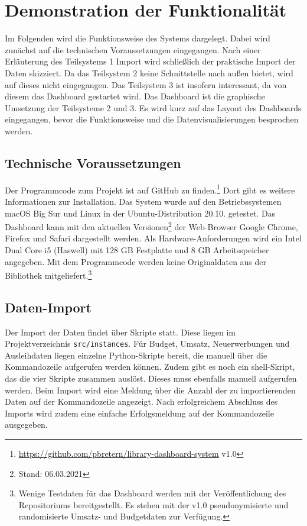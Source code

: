 
\section{Demonstration der Funktionalität}

    Im Folgenden wird die Funktionsweise des Systems dargelegt. 
    Dabei wird zunächst auf die technischen Voraussetzungen eingegangen.
    Nach einer Erläuterung des Teilsystems 1 Import wird schließlich der
    praktische Import der Daten skizziert. Da das Teilsystem 2 keine Schnittstelle
    nach außen bietet, wird auf dieses nicht eingegangen. Das Teilsystem 3 ist insofern interessant, da von diesem das Dashboard
    gestartet wird. Das Dashboard ist die graphische Umsetzung der Teilsysteme 2 und 3.
    Es wird kurz auf das Layout des Dashboards eingegangen, bevor die Funktionsweise und die Datenvisualisierungen besprochen werden.


    \subsection{Technische Voraussetzungen}
    Der Programmcode zum Projekt ist auf GitHub zu finden.\footnote{ \url{https://github.com/pbretern/library-dashboard-system} v1.0} Dort gibt es weitere Informationen zur Installation.
    Das System wurde auf den Betriebssystemen macOS Big Sur und Linux in der Ubuntu-Distribution 20.10. getestet.
    Das Dashboard kann mit den aktuellen Versionen\footnote{ Stand: 06.03.2021} der Web-Browser Google Chrome, Firefox und Safari dargestellt werden. 
    Als Hardware-Anforderungen wird ein Intel Dual Core i5 (Haswell) mit 128 GB Festplatte und 8 GB Arbeitsspeicher angegeben. 
    Mit dem Programmcode werden keine Originaldaten aus der Bibliothek mitgeliefert.\footnote{ Wenige Testdaten für das Dashboard werden mit der Veröffentlichung des Repositoriums
    bereitgestellt. Es stehen mit der v1.0 pseudonymisierte und randomisierte Umsatz- und Budgetdaten zur Verfügung.}
    
    \subsection{Daten-Import}
    Der Import der Daten findet über Skripte statt. Diese liegen im Projektverzeichnis \texttt{src/instances}.
    Für Budget, Umsatz, Neuerwerbungen und Ausleihdaten liegen einzelne Python-Skripte bereit, die manuell über die Kommandozeile
    aufgerufen werden können. Zudem gibt es noch ein shell-Skript, das die vier Skripte zusammen auslöst. Dieses
    muss ebenfalls manuell aufgerufen werden.
    Beim Import wird eine Meldung über die Anzahl der zu importierenden Daten auf der Kommandozeile angezeigt. 
    Nach erfolgreichem Abschluss des Imports wird zudem eine einfache Erfolgsmeldung auf der Kommandozeile ausgegeben.

